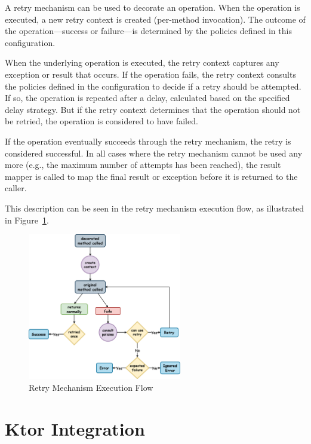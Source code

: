 A retry mechanism can be used to decorate an operation.
When the operation is executed, a new retry context is created (per-method invocation).
The outcome of the operation—success or failure—is determined by the policies defined in this configuration.

When the underlying operation is executed, the retry context captures any exception or result that occurs.
If the operation fails,
the retry context consults the policies defined in the configuration to decide if a retry should be attempted.
If so, the operation is repeated after a delay, calculated based on the specified delay strategy.
But if the retry context determines that the operation should not be retried,
the operation is considered to have failed.

If the operation eventually succeeds through the retry mechanism, the retry is considered successful.
In all cases where the retry mechanism cannot be used any more
(e.g., the maximum number of attempts has been reached),
the result mapper is called to map the final result or exception before it is returned to the caller.

This description can be seen in the retry mechanism execution flow,
as illustrated in Figure~\ref{fig:retry-execution-flow}.

\begin{figure}[!htb]
    \centering
    \includegraphics[width=0.6\textwidth]{../figures/04_retry-execution-flow}
    \caption{Retry Mechanism Execution Flow}
    \label{fig:retry-execution-flow}
\end{figure}


\section{Ktor Integration}\label{sec:retry-ktor-integration}

